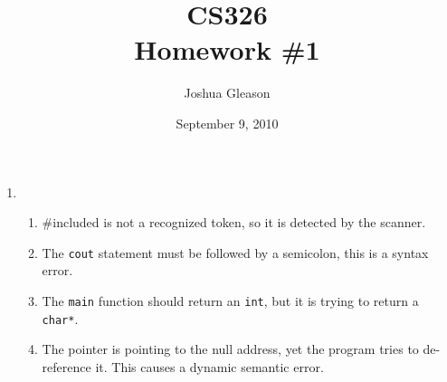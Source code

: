 \documentclass[11pt,a4paper,oneside]{article}
\begin{document}

\title{CS326 \\
       Homework \#1}
\date{September 9, 2010}

\author{Joshua Gleason}

\maketitle
\thispagestyle{empty}

\pagebreak


\begin{enumerate}
\item
\begin{enumerate}
\item \#included is not a recognized token, so it is detected by the scanner. 
  
\item The \texttt{cout} statement must be followed by a semicolon, this is a syntax error.  
  
\item The \texttt{main} function should return an \texttt{int}, but it is trying to return a \texttt{char*}.
  
\item The pointer is pointing to the null address, yet the program tries to de-reference it.  This causes
  a dynamic semantic error.
  
\end{enumerate}


\end{enumerate}
\end{document}
